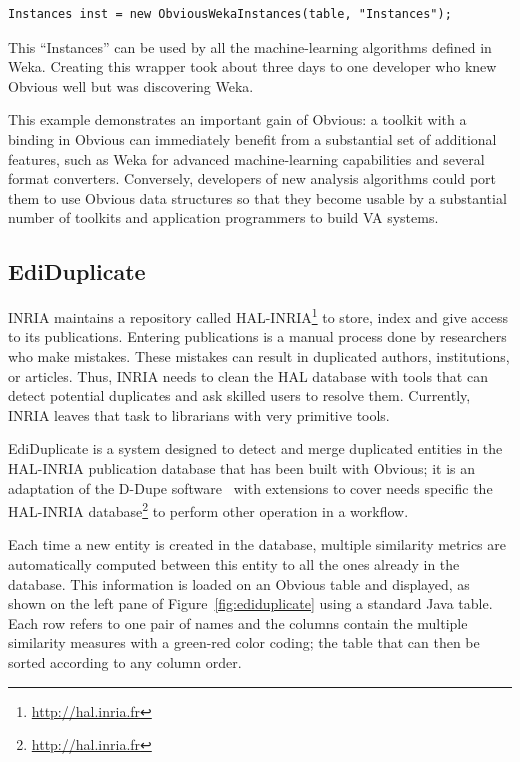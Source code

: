 \begin{lstlisting}[caption={Wrapping an Obvious Table into Weka Instances},label=wekaExample]
Instances inst = new ObviousWekaInstances(table, "Instances");
\end{lstlisting}


This ``Instances'' can be used by all the machine-learning algorithms
defined in Weka.  Creating this wrapper took about three days to one
developer who knew Obvious well but was discovering Weka.

This example demonstrates an important gain of Obvious: a toolkit with
a binding in Obvious can immediately benefit from a substantial set of
additional features, such as Weka for advanced machine-learning
capabilities and several format converters.  Conversely, developers of
new analysis algorithms could port them to use Obvious data structures
so that they become usable by a substantial number of toolkits and
application programmers to build VA systems.


\subsection{EdiDuplicate}

INRIA maintains a repository called
HAL-INRIA\footnote{\url{http://hal.inria.fr}} to store, index and give
access to its publications.  Entering publications is a manual process
done by researchers who make mistakes.  These mistakes can result in
duplicated authors, institutions, or articles. Thus, INRIA needs to
clean the HAL database with tools that can detect potential duplicates
and ask skilled users to resolve them.  Currently, INRIA leaves that
task to librarians with very primitive tools.

EdiDuplicate is a system designed to detect and merge duplicated
entities in the HAL-INRIA publication database that has been built
with Obvious; it is an adaptation of the D-Dupe software~\cite{DDupe}
with extensions to cover needs specific the HAL-INRIA
database\footnote{\url{http://hal.inria.fr}} to perform other
operation in a workflow.

Each time a new entity is created in the database, multiple similarity
metrics are automatically computed between this entity to all the ones
already in the database.  This information is loaded on an Obvious
table and displayed, as shown on the left pane of
Figure~\ref{fig:ediduplicate} using a standard Java table.  Each row
refers to one pair of names and the columns contain the multiple
similarity measures with a green-red color coding; the table that can
then be sorted according to any column order.

